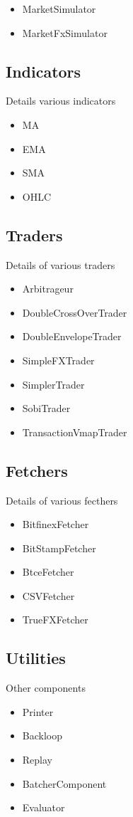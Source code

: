 \begin{itemize}
\item MarketSimulator
\item MarketFxSimulator
\end{itemize}

\subsection{Indicators}

Details various indicators

\begin{itemize}
\item MA
\item EMA
\item SMA
\item OHLC
\end{itemize}

\subsection{Traders}

Details of various traders

\begin{itemize}
\item Arbitrageur
\item DoubleCrossOverTrader
\item DoubleEnvelopeTrader
\item SimpleFXTrader
\item SimplerTrader
\item SobiTrader
\item TransactionVmapTrader
\end{itemize}

\subsection{Fetchers}

Details of various fecthers

\begin{itemize}
\item BitfinexFetcher
\item BitStampFetcher
\item BtceFetcher
\item CSVFetcher
\item TrueFXFetcher
\end{itemize}

\subsection{Utilities}

Other components

\begin{itemize}
\item Printer
\item Backloop
\item Replay
\item BatcherComponent
\item Evaluator
\end{itemize}
